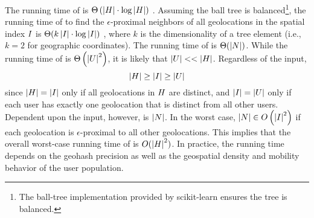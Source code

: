 The running time of  is $\Theta\left(\left\vert H \right\vert \cdot \log\left\vert H \right\vert\right)$ \cite{Omohundro1989}. Assuming the ball tree is balanced\footnote{The ball-tree implementation provided by scikit-learn \cite{sklearn2013} ensures the tree is balanced.}, the running time of  to find the $\epsilon$-proximal neighbors of all geolocations in the spatial index $I$ is $\Theta(k \left\vert I \right\vert \cdot \log\left\vert I \right\vert)$ , where $k$ is the dimensionality of a tree element (i.e., $k = 2$ for geographic coordinates). The running time of  is $\Theta(\left\vert N \right\vert)$. While the running time of  is $\Theta\left(\left\vert U \right\vert^2\right)$, it is likely that $\left\vert U \right\vert << \left\vert H \right\vert$. Regardless of the input,
\begin{equation*}
  \left\vert H \right\vert \geq \left\vert I \right\vert \geq \left\vert U \right\vert
\end{equation*}
since $\left\vert H \right\vert = \left\vert I \right\vert$ only if all geolocations in $H$ are distinct, and $\left\vert I \right\vert = \left\vert U \right\vert$ only if each user has exactly one geolocation that is distinct from all other users. Dependent upon the input, however, is $\left\vert N \right\vert$. In the worst case, $\left\vert N \right\vert \in O\left(\left\vert I \right\vert^2\right)$ if each geolocation is $\epsilon$-proximal to all other geolocations. This implies that the overall worst-case running time of  is $O(\left\vert H \right\vert^2)$. In practice, the running time depends on the geohash precision as well as the geospatial density and mobility behavior of the user population.